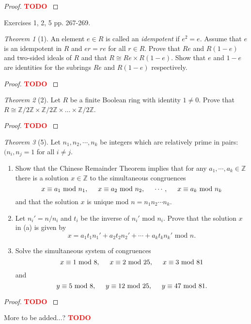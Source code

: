 \documentclass[12pt]{article}
\theoremstyle{remark}
\theoremstyle{named}
\newtheorem*{theorem}{Theorem}
\newcommand{\todo}{\textcolor{red}{\textbf{TODO} }}
\newcommand{\Z}{\mathbb Z}
\renewcommand{\mod}{\text{ mod }}
\begin{document}
\begin{proof}
    \todo
\end{proof}

Exercises 1, 2, 5 pp. 267-269.

\begin{theorem}[1]
    An element \(e \in R\) is called an \textit{idempotent} if \(e^2 = e\). Assume that \(e\) is an idempotent in \(R\) and \(er = re\) for all \(r \in R\). Prove that \(Re\) and \(R(1 - e)\) and two-sided ideals of \(R\) and that \(R \cong Re \times R(1 - e)\). Show that \(e\) and \(1 - e\) are identities for the subrings \(Re\) and \(R(1 - e)\) respectively.
\end{theorem}

\begin{proof}
    \todo
\end{proof}

\begin{theorem}[2]
    Let \(R\) be a finite Boolean ring with identity \(1 \neq 0\). Prove that \(R \cong \Z / 2 \Z \times \Z / 2 \Z \times \dots \times \Z / 2 \Z\).
\end{theorem}

\begin{proof}
    \todo
\end{proof}

\begin{theorem}[5]
    Let \(n_1, n_2, \cdots, n_k\) be integers which are relatively prime in pairs: \((n_i, n_j = 1\) for all \(i \neq j\). 
    \begin{enumerate}
        \item Show that the Chinese Remainder Theorem implies that for any \(a_1, \cdots, a_k \in \Z\) there is a solution \(x \in \Z\) to the simultaneous congruences
        \[x \equiv a_1 \mod n_1, \hspace*{5mm} x \equiv a_2 \mod n_2, \hspace*{5mm} \cdots, \hspace*{5mm} x \equiv a_k \mod n_k\]
        and that the solution \(x\) is unique mod \(n = n_1n_2\cdots n_k\).
        \item Let \(n_i' = n / n_i\) and \(t_i\) be the inverse of \(n_i' \mod n_i\). Prove that the solution \(x\) in (a) is given by \[x = a_1 t_1 n_1' + a_2 t_2 n_2' + \cdots + a_k t_k n_k' \mod n.\]
        \item Solve the simultaneous system of congruences
        \[x \equiv 1 \mod 8, \hspace*{5mm} x \equiv 2 \mod 25, \hspace*{5mm} x \equiv 3 \mod 81\]
        and \[y \equiv 5 \mod 8, \hspace*{5mm} y \equiv 12 \mod 25, \hspace*{5mm} y \equiv 47 \mod 81.\]
    \end{enumerate}
\end{theorem}

\begin{proof}
    \todo
\end{proof}

More to be added...? \todo
\end{document}
